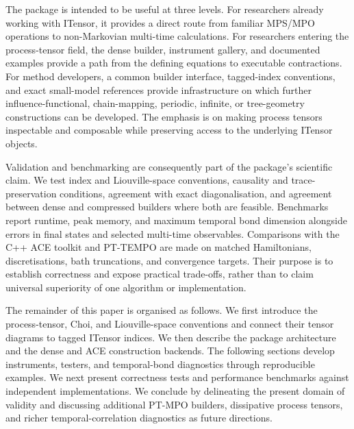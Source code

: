 The package is intended to be useful at three levels.  For researchers already working with ITensor, it provides a direct route from familiar MPS/MPO operations to non-Markovian multi-time calculations.  For researchers entering the process-tensor field, the dense builder, instrument gallery, and documented examples provide a path from the defining equations to executable contractions.  For method developers, a common builder interface, tagged-index conventions, and exact small-model references provide infrastructure on which further influence-functional, chain-mapping, periodic, infinite, or tree-geometry constructions can be developed.  The emphasis is on making process tensors inspectable and composable while preserving access to the underlying ITensor objects.

Validation and benchmarking are consequently part of the package's scientific claim.  We test index and Liouville-space conventions, causality and trace-preservation conditions, agreement with exact diagonalisation, and agreement between dense and compressed builders where both are feasible.  Benchmarks report runtime, peak memory, and maximum temporal bond dimension alongside errors in final states and selected multi-time observables.  Comparisons with the C++ ACE toolkit and PT-TEMPO are made on matched Hamiltonians, discretisations, bath truncations, and convergence targets.  Their purpose is to establish correctness and expose practical trade-offs, rather than to claim universal superiority of one algorithm or implementation.

The remainder of this paper is organised as follows.  We first introduce the process-tensor, Choi, and Liouville-space conventions and connect their tensor diagrams to tagged ITensor indices.  We then describe the package architecture and the dense and ACE construction backends.  The following sections develop instruments, testers, and temporal-bond diagnostics through reproducible examples.  We next present correctness tests and performance benchmarks against independent implementations.  We conclude by delineating the present domain of validity and discussing additional PT-MPO builders, dissipative process tensors, and richer temporal-correlation diagnostics as future directions.
